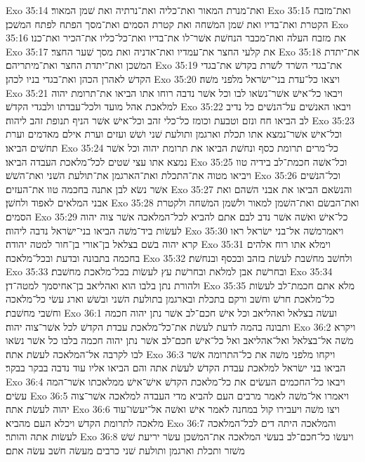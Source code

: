 Exo 35:14  ואת־מנרת המאור ואת־כליה ואת־נרתיה ואת שׁמן המאור׃
Exo 35:15  ואת־מזבח הקטרת ואת־בדיו ואת שׁמן המשׁחה ואת קטרת הסמים ואת־מסך הפתח לפתח המשׁכן׃
Exo 35:16  את מזבח העלה ואת־מכבר הנחשׁת אשׁר־לו את־בדיו ואת־כל־כליו את־הכיר ואת־כנו׃
Exo 35:17  את קלעי החצר את־עמדיו ואת־אדניה ואת מסך שׁער החצר׃
Exo 35:18  את־יתדת המשׁכן ואת־יתדת החצר ואת־מיתריהם׃
Exo 35:19  את־בגדי השׂרד לשׁרת בקדשׁ את־בגדי הקדשׁ לאהרן הכהן ואת־בגדי בניו לכהן׃
Exo 35:20  ויצאו כל־עדת בני־ישׂראל מלפני משׁה׃
Exo 35:21  ויבאו כל־אישׁ אשׁר־נשׂאו לבו וכל אשׁר נדבה רוחו אתו הביאו את־תרומת יהוה למלאכת אהל מועד ולכל־עבדתו ולבגדי הקדשׁ׃
Exo 35:22  ויבאו האנשׁים על־הנשׁים כל נדיב לב הביאו חח ונזם וטבעת וכומז כל־כלי זהב וכל־אישׁ אשׁר הניף תנופת זהב ליהוה׃
Exo 35:23  וכל־אישׁ אשׁר־נמצא אתו תכלת וארגמן ותולעת שׁני ושׁשׁ ועזים וערת אילם מאדמים וערת תחשׁים הביאו׃
Exo 35:24  כל־מרים תרומת כסף ונחשׁת הביאו את תרומת יהוה וכל אשׁר נמצא אתו עצי שׁטים לכל־מלאכת העבדה הביאו׃
Exo 35:25  וכל־אשׁה חכמת־לב בידיה טוו ויביאו מטוה את־התכלת ואת־הארגמן את־תולעת השׁני ואת־השׁשׁ׃
Exo 35:26  וכל־הנשׁים אשׁר נשׂא לבן אתנה בחכמה טוו את־העזים׃
Exo 35:27  והנשׂאם הביאו את אבני השׁהם ואת אבני המלאים לאפוד ולחשׁן׃
Exo 35:28  ואת־הבשׂם ואת־השׁמן למאור ולשׁמן המשׁחה ולקטרת הסמים׃
Exo 35:29  כל־אישׁ ואשׁה אשׁר נדב לבם אתם להביא לכל־המלאכה אשׁר צוה יהוה לעשׂות ביד־משׁה הביאו בני־ישׂראל נדבה ליהוה׃
Exo 35:30  ויאמרמשׁה אל־בני ישׂראל ראו קרא יהוה בשׁם בצלאל בן־אורי בן־חור למטה יהודה׃
Exo 35:31  וימלא אתו רוח אלהים בחכמה בתבונה ובדעת ובכל־מלאכה׃
Exo 35:32  ולחשׁב מחשׁבת לעשׂת בזהב ובכסף ובנחשׁת׃
Exo 35:33  ובחרשׁת אבן למלאת ובחרשׁת עץ לעשׂות בכל־מלאכת מחשׁבת׃
Exo 35:34  ולהורת נתן בלבו הוא ואהליאב בן־אחיסמך למטה־דן׃
Exo 35:35  מלא אתם חכמת־לב לעשׂות כל־מלאכת חרשׁ וחשׁב ורקם בתכלת ובארגמן בתולעת השׁני ובשׁשׁ וארג עשׂי כל־מלאכה וחשׁבי מחשׁבת׃
Exo 36:1  ועשׂה בצלאל ואהליאב וכל אישׁ חכם־לב אשׁר נתן יהוה חכמה ותבונה בהמה לדעת לעשׂת את־כל־מלאכת עבדת הקדשׁ לכל אשׁר־צוה יהוה׃
Exo 36:2  ויקרא משׁה אל־בצלאל ואל־אהליאב ואל כל־אישׁ חכם־לב אשׁר נתן יהוה חכמה בלבו כל אשׁר נשׂאו לבו לקרבה אל־המלאכה לעשׂת אתה׃
Exo 36:3  ויקחו מלפני משׁה את כל־התרומה אשׁר הביאו בני ישׂראל למלאכת עבדת הקדשׁ לעשׂת אתה והם הביאו אליו עוד נדבה בבקר בבקר׃
Exo 36:4  ויבאו כל־החכמים העשׂים את כל־מלאכת הקדשׁ אישׁ־אישׁ ממלאכתו אשׁר־המה עשׂים׃
Exo 36:5  ויאמרו אל־משׁה לאמר מרבים העם להביא מדי העבדה למלאכה אשׁר־צוה יהוה לעשׂת אתה׃
Exo 36:6  ויצו משׁה ויעבירו קול במחנה לאמר אישׁ ואשׁה אל־יעשׂו־עוד מלאכה לתרומת הקדשׁ ויכלא העם מהביא׃
Exo 36:7  והמלאכה היתה דים לכל־המלאכה לעשׂות אתה והותר׃
Exo 36:8  ויעשׂו כל־חכם־לב בעשׂי המלאכה את־המשׁכן עשׂר יריעת שׁשׁ משׁזר ותכלת וארגמן ותולעת שׁני כרבים מעשׂה חשׁב עשׂה אתם׃
